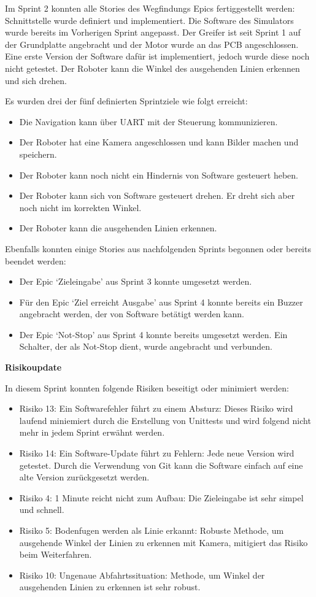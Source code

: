 Im Sprint 2 konnten alle Stories des Wegfindungs Epics fertiggestellt werden: Schnittstelle wurde definiert und implementiert. Die Software des Simulators wurde bereits im Vorherigen Sprint angepasst.
Der Greifer ist seit Sprint 1 auf der Grundplatte angebracht und der Motor wurde an das PCB angeschlossen. Eine erste Version der Software dafür ist implementiert, jedoch wurde diese noch nicht getestet. Der Roboter kann die Winkel des ausgehenden Linien erkennen und sich drehen.

Es wurden drei der fünf definierten Sprintziele wie folgt erreicht:
\begin{itemize}
    \item Die Navigation kann über UART mit der Steuerung kommunizieren.
    \item Der Roboter hat eine Kamera angeschlossen und kann Bilder machen und speichern.
    \item Der Roboter kann noch nicht ein Hindernis von Software gesteuert heben.
    \item Der Roboter kann sich von Software gesteuert drehen. Er dreht sich aber noch nicht im korrekten Winkel.
    \item Der Roboter kann die ausgehenden Linien erkennen.
\end{itemize}

Ebenfalls konnten einige Stories aus nachfolgenden Sprints begonnen oder bereits beendet werden:
\begin{itemize}
    \item Der Epic `Zieleingabe' aus Sprint 3 konnte umgesetzt werden.
    \item Für den Epic `Ziel erreicht Ausgabe' aus Sprint 4 konnte bereits ein Buzzer angebracht werden, der von Software betätigt werden kann.
    \item Der Epic `Not-Stop' aus Sprint 4 konnte bereits umgesetzt werden. Ein Schalter, der als Not-Stop dient, wurde angebracht und verbunden.
\end{itemize}


\textbf{Risikoupdate}
\label{risks-sprint-2}

In diesem Sprint konnten folgende Risiken beseitigt oder minimiert werden:
\begin{itemize}
    \item Risiko 13: Ein Softwarefehler führt zu einem Absturz: Dieses Risiko wird laufend miniemiert durch die Erstellung von Unittests und wird folgend nicht mehr in jedem Sprint erwähnt werden.
    \item Risiko 14: Ein Software-Update führt zu Fehlern: Jede neue Version wird getestet. Durch die Verwendung von Git kann die Software einfach auf eine alte Version zurückgesetzt werden. 
    \item Risiko 4: 1 Minute reicht nicht zum Aufbau: Die Zieleingabe ist sehr simpel und schnell.
    \item Risiko 5: Bodenfugen werden  als Linie erkannt: Robuste Methode, um ausgehende Winkel der Linien zu erkennen mit Kamera, mitigiert das Risiko beim Weiterfahren.
    \item Risiko 10: Ungenaue Abfahrtssituation: Methode, um Winkel der ausgehenden Linien zu erkennen ist sehr robust.
\end{itemize}

